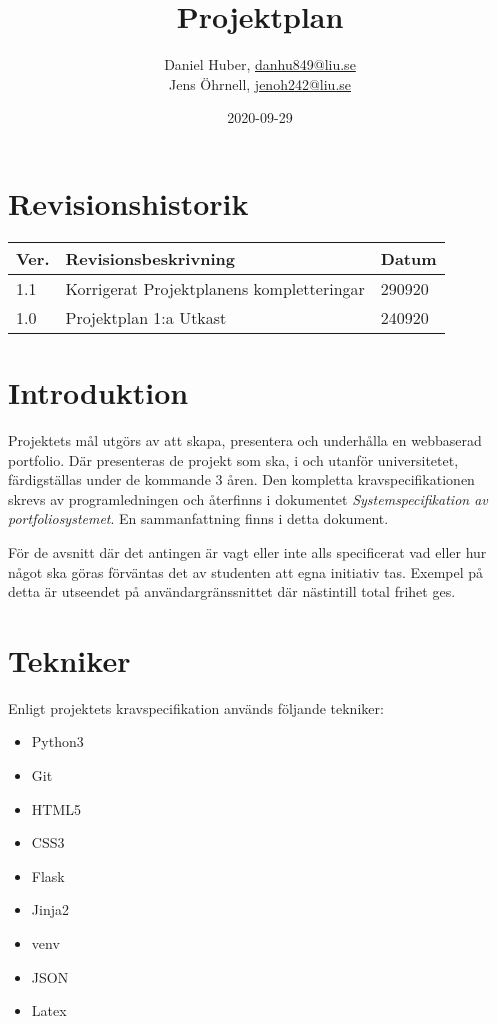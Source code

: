 \documentclass{TDP003mall}
\author{Daniel Huber, \url{danhu849@liu.se}\\
  Jens Öhrnell, \url{jenoh242@liu.se}}
\title{Projektplan}
\date{2020-09-29}
\begin{document}
\projectpage

\tableofcontents

\newpage
\section{Revisionshistorik}
\begin{table}[!h]
\begin{tabularx}{\linewidth}{|l|X|l|}
\hline
  Ver. & Revisionsbeskrivning & Datum \\\hline
  1.1 & Korrigerat Projektplanens kompletteringar & 290920 \\\hline
  1.0 & Projektplan 1:a Utkast & 240920 \\\hline
\end{tabularx}
\end{table}


\section{Introduktion}
Projektets mål utgörs av att skapa, presentera och underhålla en webbaserad portfolio. Där presenteras de projekt som ska, i och utanför universitetet, färdigställas under de kommande 3 åren. Den kompletta kravspecifikationen skrevs av programledningen och återfinns i dokumentet \textit{Systemspecifikation av portfoliosystemet}. En sammanfattning finns i detta dokument.

För de avsnitt där det antingen är vagt eller inte alls specificerat vad eller hur något ska göras förväntas det av studenten att egna initiativ tas. Exempel på detta är utseendet på användargränssnittet där nästintill total frihet ges.

\section{Tekniker}
Enligt projektets kravspecifikation används följande tekniker:
\begin{itemize}
\item Python3
\item Git
\item HTML5
\item CSS3
\item Flask
\item Jinja2
\item venv
\item JSON
\item Latex
\end{itemize}
\end{document}

